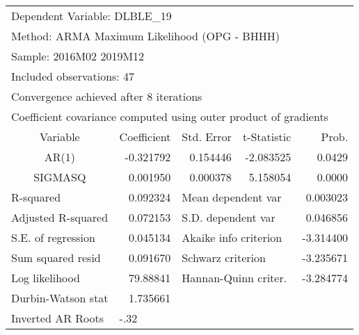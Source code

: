 \begin{tabular}{lrrrr}
\toprule
\multicolumn{3}{l}{Dependent Variable: DLBLE\_19}&\multicolumn{1}{c}{}&\multicolumn{1}{c}{}\\
\multicolumn{4}{l}{Method: ARMA Maximum Likelihood (OPG - BHHH)}&\multicolumn{1}{c}{}\\
\multicolumn{2}{l}{Sample: 2016M02 2019M12}&\multicolumn{1}{c}{}&\multicolumn{1}{c}{}&\multicolumn{1}{c}{}\\
\multicolumn{2}{l}{Included observations: 47}&\multicolumn{1}{c}{}&\multicolumn{1}{c}{}&\multicolumn{1}{c}{}\\
\multicolumn{3}{l}{Convergence achieved after 8 iterations}&\multicolumn{1}{c}{}&\multicolumn{1}{c}{}\\
\multicolumn{5}{l}{Coefficient covariance computed using outer product of gradients}\\
\midrule
\multicolumn{1}{c}{Variable}&\multicolumn{1}{r}{Coefficient}&\multicolumn{1}{r}{Std. Error}&\multicolumn{1}{r}{t-Statistic}&\multicolumn{1}{r}{Prob.}\\
\midrule
\multicolumn{1}{c}{AR(1)}&\multicolumn{1}{r}{-0.321792}&\multicolumn{1}{r}{0.154446}&\multicolumn{1}{r}{-2.083525}&\multicolumn{1}{r}{0.0429}\\
\multicolumn{1}{c}{SIGMASQ}&\multicolumn{1}{r}{0.001950}&\multicolumn{1}{r}{0.000378}&\multicolumn{1}{r}{5.158054}&\multicolumn{1}{r}{0.0000}\\
\midrule
\multicolumn{1}{l}{R-squared}&\multicolumn{1}{r}{0.092324}&\multicolumn{2}{l}{Mean dependent var}&\multicolumn{1}{r}{0.003023}\\
\multicolumn{1}{l}{Adjusted R-squared}&\multicolumn{1}{r}{0.072153}&\multicolumn{2}{l}{S.D. dependent var}&\multicolumn{1}{r}{0.046856}\\
\multicolumn{1}{l}{S.E. of regression}&\multicolumn{1}{r}{0.045134}&\multicolumn{2}{l}{Akaike info criterion}&\multicolumn{1}{r}{-3.314400}\\
\multicolumn{1}{l}{Sum squared resid}&\multicolumn{1}{r}{0.091670}&\multicolumn{2}{l}{Schwarz criterion}&\multicolumn{1}{r}{-3.235671}\\
\multicolumn{1}{l}{Log likelihood}&\multicolumn{1}{r}{79.88841}&\multicolumn{2}{l}{Hannan-Quinn criter.}&\multicolumn{1}{r}{-3.284774}\\
\multicolumn{1}{l}{Durbin-Watson stat}&\multicolumn{1}{r}{1.735661}&\multicolumn{1}{c}{}&\multicolumn{1}{c}{}&\multicolumn{1}{c}{}\\
\midrule
\multicolumn{1}{l}{Inverted AR Roots}&\multicolumn{1}{l}{-.32}&\multicolumn{1}{c}{}&\multicolumn{1}{c}{}&\multicolumn{1}{c}{}\\
\bottomrule
\end{tabular}
